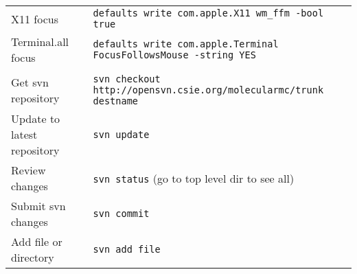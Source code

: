 \documentclass[a4paper,10pt]{article}
\begin{document}
\begin{table}
\begin{tabular}{ll}
\\
X11 focus           & \verb"defaults write com.apple.X11 wm_ffm -bool true"\\
Terminal.all focus  & \verb"defaults write com.apple.Terminal FocusFollowsMouse -string YES"\\
\\
Get svn repository   & \verb"svn checkout http://opensvn.csie.org/molecularmc/trunk destname"\\
Update to latest repository & \verb"svn update"\\
Review changes       & \verb"svn status" (go to top level dir to see all)\\
Submit svn changes   & \verb"svn commit"\\
Add file or directory& \verb"svn add file"\\
\hline
\end{tabular}
\end{table}
\end{document}
